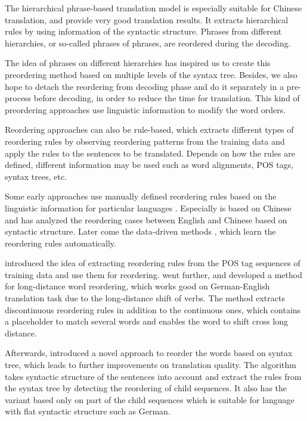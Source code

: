The hierarchical phrase-based translation model \citep{hier} is especially suitable for Chinese translation, and provide very good translation results. It extracts hierarchical rules by using information of the syntactic structure. Phrases from different hierarchies, or so-called phrases of phrases, are reordered during the decoding. 

The idea of phrases on different hierarchies has inspired us to create this preordering method based on multiple levels of the syntax tree. Besides, we also hope to detach the reordering from decoding phase and do it separately in a pre-process before decoding, in order to reduce the time for translation. This kind of preordering approaches use linguistic information to modify the word orders. 

Reordering approaches can also be rule-based, which extracts different types of reordering rules by observing reordering patterns from the training data and apply the rules to the sentences to be translated. Depends on how the rules are defined, different information may be used such as word alignments, \ac{POS} tags, syntax trees, etc.

Some early approaches use manually defined reordering rules based on the linguistic information for particular languages \citep{collins2005clause, popovic2006pos,habash2007syntactic}. Especially \cite{syntactic} is based on Chinese and has analyzed the reordering cases between English and Chinese based on syntactic structure. Later come the data-driven methods \citep{zhang2007chunk, crego2008using}, which learn the reordering rules automatically. 

\cite{short} introduced the idea of extracting reordering rules from the POS tag sequences of training data and use them for reordering. \cite{long} went further, and developed a method for long-distance word reordering, which works good on German-English translation task due to the long-distance shift of verbs. The method extracts discontinuous reordering rules in addition to the continuous ones, which contains a placeholder to match several words and enables the word to shift cross long distance.

Afterwards, \cite{tree} introduced a novel approach to reorder the words based on syntax tree, which leads to further improvements on translation quality. The algorithm takes syntactic structure of the sentences into account and extract the rules from the syntax tree by detecting the reordering of child sequences. It also has the variant based only on part of the child sequences which is suitable for language with flat syntactic structure such as German.

